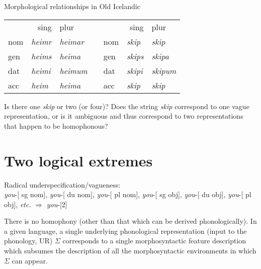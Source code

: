 \documentclass[10pt]{article}
\begin{document}
\clearpage
\begin{example}\label{heim}Morphological relationships in Old Icelandic


\begin{tabular}{|l| l l|c|l| l| l|} \cline{1-3} \cline{5-7}
\multicolumn{2}{|r}{\sc sing}&{\sc plur}&\hspace{1in}&\multicolumn{2}{|r}{\sc sing}&{\sc plur}  \\ \cline{2-3} \cline{6-7}
{\sc nom}&{\it heimr}&{\it heimar}&\hspace{1in}& {\sc nom}&{\it skip}&{{\it skip}}\\ 
{\sc gen}&{\it heims}&{\it heima} &\hspace{1in}&{\sc gen}&{\it skips}&{\it skipa} \\ 
{\sc dat}&{\it heimi}&{\it heimum}&\hspace{1in}&{\sc dat}&{\it skipi}&{\it skipum} \\ 
{\sc acc}&{\it heim}&{\it heima}&\hspace{1in}&{\sc acc}&{\it skip}&{\it skip} \\ \cline{1-3} \cline{5-7}
\end{tabular}
\end{example}




\noindent Is there one {\it skip} or two (or four)? Does the {\sc string} {\it skip} correspond to one {\sc vague} representation, or is it {\sc ambiguous} and thus correspond to two representations that happen to be homophonous?




\section{Two logical extremes}


\begin{example}\label{radvag}Radical underspecification/vagueness: \\ {\it you}-[{ sg nom}], {\it you}-[{ du nom}], {\it you}-[{ pl nom}], {\it you}-[{ sg obj}], {\it you}-[{ du obj}], {\it you}-[{ pl obj}], {\it etc.}  $\Rightarrow$ {\it you}-[2]

There is no homophony (other than that which can be derived phonologically). In a given language, a single underlying phonological representation (input to the phonology, UR) $\Sigma$ corresponds to a single morphosyntactic feature description which subsumes the description of all the morphosyntactic environments in which  $\Sigma$ can appear. 
\end{example}
\end{document}
